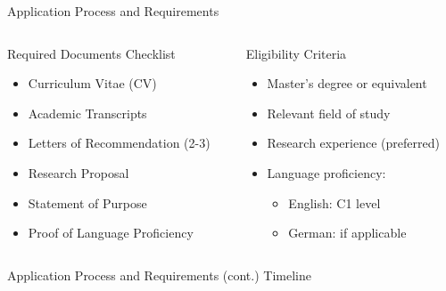 \documentclass[10pt]{beamer}
\begin{document}
\begin{frame}[fragile]{Application Process and Requirements}
\begin{columns}[T]
    \begin{column}{0.6\textwidth}
        \alert{Required Documents Checklist}
        \begin{itemize}
            \item [ ] Curriculum Vitae (CV)
            \item [ ] Academic Transcripts
            \item [ ] Letters of Recommendation (2-3)
            \item [ ] Research Proposal
            \item [ ] Statement of Purpose
            \item [ ] Proof of Language Proficiency
        \end{itemize}
    \end{column}
    \begin{column}{0.4\textwidth}
        \alert{Eligibility Criteria}
        \begin{itemize}
            \item Master's degree or equivalent
            \item Relevant field of study
            \item Research experience (preferred)
            \item Language proficiency:
                \begin{itemize}
                    \item English: C1 level
                    \item German: if applicable
                \end{itemize}
        \end{itemize}
    \end{column}
\end{columns}
\end{frame}

\begin{frame}[fragile]{Application Process and Requirements (cont.)}
\alert{Timeline}
\end{frame}
\end{document}
